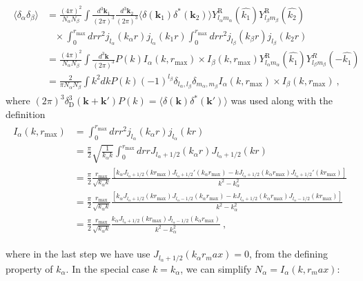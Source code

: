 \documentclass[11pt, oneside]{article}   	%
\newcommand{\sph}[2]{Y^\text{R}_{l_#1 m_#1}(\hat{#2})}
\newcommand{\jl}[1]{j_{l_#1}}
\newcommand{\dk}{\frac{ d^3 \mathbf{k}}{(2 \pi)^3}}
\newcommand{ \dkv}[1]{\frac{ d^3 \mathbf{k}_{#1}}{(2 \pi)^3}}
\begin{document}
\begin{align} 
\begin{split} 
\langle \delta_\alpha \delta_\beta \rangle &= \frac{ (4 \pi)^2}{N_\alpha N_\beta} \int  \dkv{1} \dkv{2} \langle \delta(\mathbf{k}_1) \delta^*(\mathbf{k}_2) \rangle \sph{\alpha}{k_1} \sph{\beta}{k_2} \\
& \;\;\; \times   \int_0^{r_\text{max}}  dr r^2 \jl{\alpha}(k_\alpha r) \jl{\alpha}( k_1 r) \int_0^{r_\text{max}}  dr r^2 \jl{\beta}(k_\beta r) \jl{\beta}( k_2 r)  \\
&= \frac{ (4 \pi)^2}{N_\alpha N_\beta} \int \dk P(k) I_\alpha(k, r_\text{max}) \times I_\beta(k, r_\text{max})\sph{\alpha}{k_1}Y^R_{l_\beta m_\beta}(-\hat{k_1})\\
&=\frac{2}{\pi N_\alpha N_\beta}\int{k^2 dk P(k)(-1)^{l_\beta} \delta_{l_\alpha,l_\beta}\delta_{m_\alpha,m_\beta} I_\alpha(k, r_\text{max}) \times I_\beta(k, r_\text{max})}~,
\end{split} 
\end{align} 
where $(2 \pi)^3 \delta^3_\text{D}( \mathbf{k} + \mathbf{k}') P(k) =  \langle \delta(\mathbf{k}) \delta^*(\mathbf{k}') \rangle$ was used along with the definition 
\begin{align}\label{i_alpha}
\begin{split} 
I_\alpha(k,  r_\text{max}) & =  \int_0^{r_\text{max}}dr r^2 \jl{\alpha}(k_\alpha r) \jl{\alpha}( k r) \\
& = \frac{\pi}{2} \sqrt{ \frac{1}{k _ \alpha k}} \int_0^{r_\text{max}}dr r J_{l_\alpha+ 1/2}(k_\alpha r)  J_{l_\alpha+ 1/2}( k r) \\
& = \frac{\pi}{2} \frac{ r_\text{max}}{ \sqrt{ k _ \alpha k}}\frac{\left[k_\alpha J_{l_\alpha+ 1/2}( k  r_\text{max})J_{l_\alpha+ 1/2}'(k_\alpha  r_\text{max}) - k J_{l_\alpha+ 1/2}(k_\alpha  r_\text{max})J_{l_\alpha+ 1/2}'(k  r_\text{max})\right]}{k^2 - k_\alpha^2}\\
& = \frac{\pi}{2} \frac{ r_\text{max}}{ \sqrt{ k _ \alpha k}}\frac{\left[k_\alpha J_{l_\alpha+ 1/2}( k  r_\text{max})J_{l_\alpha- 1/2}(k_\alpha  r_\text{max}) - k J_{l_\alpha+ 1/2}(k_\alpha  r_\text{max})J_{l_\alpha- 1/2}(k  r_\text{max})\right]}{k^2 - k_\alpha^2}\\
& = \frac{\pi}{2} \frac{ r_\text{max}}{ \sqrt{ k _ \alpha k}}\frac{k_\alpha J_{l_\alpha+ 1/2}( k  r_{\text{max}})J_{l_\alpha- 1/2}(k_\alpha  r_\text{max})}{k^2 - k_\alpha^2}~,
\end{split} 
\end{align}

where in the last step we have use $J_{l_\alpha+1/2}(k_\alpha r_max)=0$, from the defining property of $k_\alpha$. In the special case $k=k_\alpha$, we can simplify $N_\alpha = I_\alpha(k,r_max)$:
\end{document}
